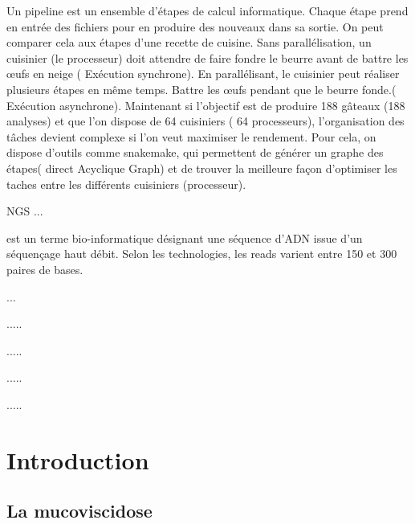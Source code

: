 \documentclass[12pt,a4paper]{article}
\begin{document}
\begin{description}
\item[Pipeline] 
Un pipeline est un ensemble d'étapes de calcul informatique. Chaque étape prend en entrée des fichiers pour en produire des nouveaux dans sa sortie. On peut comparer cela aux étapes d'une recette de cuisine. Sans parallélisation, un cuisinier (le processeur) doit attendre de faire fondre le beurre avant de battre les œufs en neige ( Exécution synchrone). En parallélisant, le cuisinier peut réaliser plusieurs étapes en même temps. Battre les œufs pendant que le beurre fonde.( Exécution asynchrone). 
Maintenant si l'objectif est de produire 188 gâteaux (188 analyses) et que l'on dispose de 64 cuisiniers ( 64 processeurs), l'organisation des tâches devient complexe si l'on veut maximiser le rendement. Pour cela, on dispose d'outils comme snakemake, qui permettent de générer un graphe des étapes( direct Acyclique Graph) et de trouver la meilleure façon d'optimiser les taches entre les différents cuisiniers (processeur). 

\item{NGS} ... 

\item[Un read] est un terme bio-informatique désignant une séquence d’ADN issue d’un séquençage haut débit. Selon les technologies, les reads varient entre 150 et 300 paires de bases.

\item[librarie] ... 

\item[Un fichier fastq] .....

\item[Un fichier fasta] .....

\item[Un fichier biom] .....

\item[R] .....


\end{description}

\newpage

\setcounter{page}{1}

\section{Introduction}
\subsection{La mucoviscidose}
\end{document}

